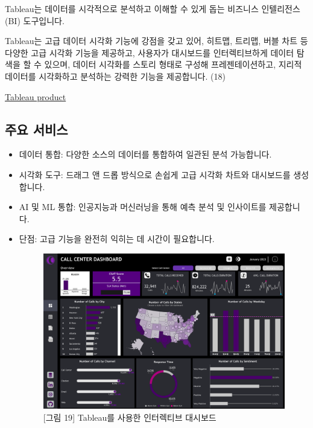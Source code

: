 \documentclass[
  letterpaper,
]{book}
\begin{document}
Tableau는 데이터를 시각적으로 분석하고 이해할 수 있게 돕는 비즈니스
인텔리전스(BI) 도구입니다.

Tableau는 고급 데이터 시각화 기능에 강점을 갖고 있어, 히트맵, 트리맵,
버블 차트 등 다양한 고급 시각화 기능을 제공하고, 사용자가 대시보드를
인터렉티브하게 데이터 탐색을 할 수 있으며, 데이터 시각화를 스토리 형태로
구성해 프레젠테이션하고, 지리적 데이터를 시각화하고 분석하는 강력한
기능을 제공합니다. (18)

\href{https://www.tableau.com/ko-kr/products/tableau}{Tableau product}

\subsection{주요 서비스}\label{uxc8fcuxc694-uxc11cuxbe44uxc2a4-2}

\begin{itemize}
\item
  데이터 통합: 다양한 소스의 데이터를 통합하여 일관된 분석 가능합니다.
\item
  시각화 도구: 드래그 앤 드롭 방식으로 손쉽게 고급 시각화 차트와
  대시보드를 생성합니다.
\item
  AI 및 ML 통합: 인공지능과 머신러닝을 통해 예측 분석 및 인사이트를
  제공합니다.
\item
  단점: 고급 기능을 완전히 익히는 데 시간이 필요합니다.

  \begin{figure}[H]

  {\centering \includegraphics{img/fig19.png}

  }

  \caption{{[}그림 19{]} Tableau를 사용한 인터렉티브 대시보드}

  \end{figure}%
\end{itemize}
\end{document}
